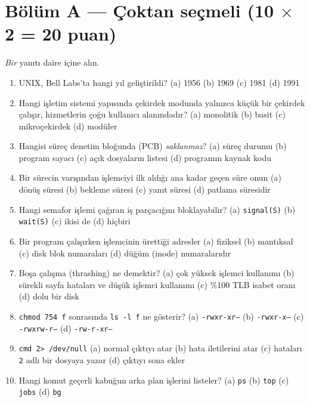 \section*{Bölüm A --- Çoktan seçmeli \hfill (10 $\times$ 2 = 20 puan)}
\emph{Bir} yanıtı daire içine alın.
\begin{enumerate}[leftmargin=1.8em,label=A\arabic*.,itemsep=0.35em]
  \item UNIX, Bell Labs'ta hangi yıl geliştirildi? \quad (a) 1956 \quad (b) 1969 \quad (c) 1981 \quad (d) 1991
  \item Hangi işletim sistemi yapısında çekirdek modunda yalnızca küçük bir çekirdek çalışır, hizmetlerin çoğu kullanıcı alanındadır? \quad (a) monolitik \quad (b) basit \quad (c) mikroçekirdek \quad (d) modüler
  \item Hangisi süreç denetim bloğunda (PCB) \emph{saklanmaz}? \quad (a) süreç durumu \quad (b) program sayacı \quad (c) açık dosyaların listesi \quad (d) programın kaynak kodu
  \item Bir sürecin varışından işlemciyi ilk aldığı ana kadar geçen süre onun \quad (a) dönüş süresi \quad (b) bekleme süresi \quad (c) yanıt süresi \quad (d) patlama süresidir
  \item Hangi semafor işlemi çağıran iş parçacığını bloklayabilir? \quad (a) \texttt{signal(S)} \quad (b) \texttt{wait(S)} \quad (c) ikisi de \quad (d) hiçbiri
  \item Bir program çalışırken işlemcinin ürettiği adresler \quad (a) fiziksel \quad (b) mantıksal \quad (c) disk blok numaraları \quad (d) düğüm (inode) numaralarıdır
  \item Boşa çalışma (thrashing) ne demektir? \quad (a) çok yüksek işlemci kullanımı \quad (b) sürekli sayfa hataları ve düşük işlemci kullanımı \quad (c) \%100 TLB isabet oranı \quad (d) dolu bir disk
  \item \texttt{chmod 754 f} sonrasında \texttt{ls -l f} ne gösterir? \quad (a) \texttt{-rwxr-xr--} \quad (b) \texttt{-rwxr-x---} \quad (c) \texttt{-rwxrw-r--} \quad (d) \texttt{-rw-r-xr--}
  \item \texttt{cmd 2> /dev/null} \quad (a) normal çıktıyı atar \quad (b) hata iletilerini atar \quad (c) hataları \texttt{2} adlı bir dosyaya yazar \quad (d) çıktıyı sona ekler
  \item Hangi komut geçerli kabuğun arka plan işlerini listeler? \quad (a) \texttt{ps} \quad (b) \texttt{top} \quad (c) \texttt{jobs} \quad (d) \texttt{bg}
\end{enumerate}

